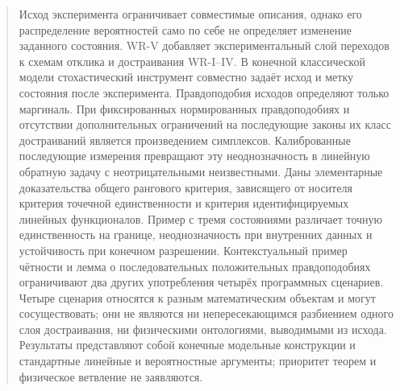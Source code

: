 \maketitle
\begin{abstract}
{Исход эксперимента ограничивает совместимые описания, однако его распределение вероятностей само по себе не определяет изменение заданного состояния. WR-V добавляет экспериментальный слой переходов к схемам отклика и достраивания WR-I--IV. В конечной классической модели стохастический инструмент совместно задаёт исход и метку состояния после эксперимента. Правдоподобия исходов определяют только маргиналь. При фиксированных нормированных правдоподобиях и отсутствии дополнительных ограничений на последующие законы их класс достраиваний является произведением симплексов. Калиброванные последующие измерения превращают эту неоднозначность в линейную обратную задачу с неотрицательными неизвестными. Даны элементарные доказательства общего рангового критерия, зависящего от носителя критерия точечной единственности и критерия идентифицируемых линейных функционалов. Пример с тремя состояниями различает точную единственность на границе, неоднозначность при внутренних данных и устойчивость при конечном разрешении. Контекстуальный пример чётности и лемма о последовательных положительных правдоподобиях ограничивают два других употребления четырёх программных сценариев. Четыре сценария относятся к разным математическим объектам и могут сосуществовать; они не являются ни непересекающимся разбиением одного слоя достраивания, ни физическими онтологиями, выводимыми из исхода. Результаты представляют собой конечные модельные конструкции и стандартные линейные и вероятностные аргументы; приоритет теорем и физическое ветвление не заявляются.}
\end{abstract}
